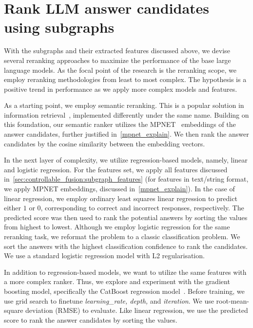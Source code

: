 \section{Rank LLM answer candidates using subgraphs} \label{sec:controllable_fusion:ranker}
With the subgraphs and their extracted features discussed above, we devise several reranking approaches to maximize the performance of the base large language models. As the focal point of the research is the reranking scope, we employ reranking methodologies from least to most complex. The hypothesis is a positive trend in performance as we apply more complex models and features.

As a starting point, we employ semantic reranking. This is a popular solution in information retrieval~\cite{DBLP:journals/jifs/FigueroaPP20, DBLP:journals/corr/HendersonASSLGK17}, implemented differently under the same name. Building on this foundation, our semantic ranker utilizes the MPNET~\cite{DBLP:conf/nips/Song0QLL20} embeddings of the answer candidates, further justified in~\ref{mpnet_explain}. We then rank the answer candidates by the cosine similarity between the embedding vectors. 

In the next layer of complexity, we utilize regression-based models, namely, linear and logistic regression. %
For the features set, we apply all features discussed in~\ref{sec:controllable_fusion:subgraph_features} (for features in text/string format, we apply MPNET embeddings, discussed in~\ref{mpnet_explain}). In the case of linear regression, we employ ordinary least squares linear regression to predict either $1$ or $0$, corresponding to correct and incorrect responses, respectively. The predicted score was then used to rank the potential answers by sorting the values from highest to lowest. Although we employ logistic regression for the same reranking task, we reformat the problem to a classic classification problem. We sort the answers with the highest classification confidence to rank the candidates. We use a standard logistic regression model with L2 regularisation. 

In addition to regression-based models, we want to utilize the same features with a more complex ranker. Thus, we explore and experiment with the gradient boosting model, specifically the CatBoost regression model~\cite{DBLP:conf/nips/ProkhorenkovaGV18-catboost}. Before training, we use grid search to finetune \textit{learning\_rate, depth,} and \textit{iteration}. We use root-mean-square deviation (RMSE) to evaluate. Like linear regression, we use the predicted score to rank the answer candidates by sorting the values. 

